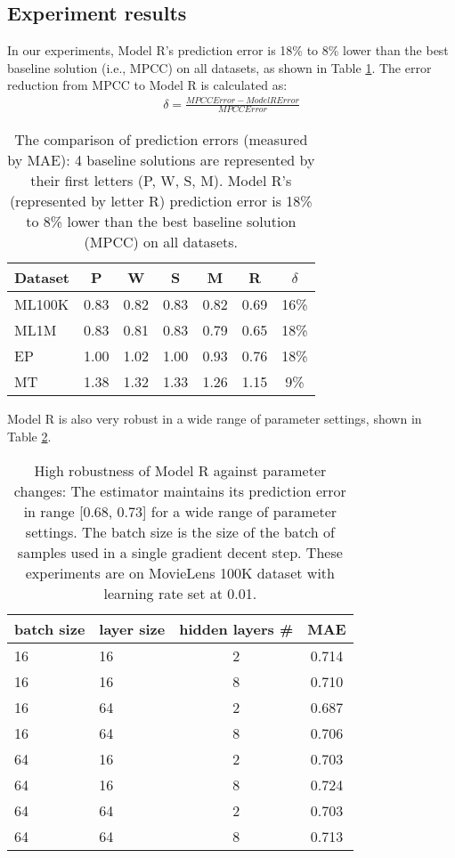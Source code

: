 \documentclass[letterpaper]{article}
\begin{document}
\subsection{Experiment results}
In our experiments, Model R's prediction error is 18\% to 8\% lower than
the best baseline solution (i.e., MPCC) on all datasets, as shown in Table 
\ref{tab:errors}.
The error reduction from MPCC to Model R is calculated as:
\begin{align*}
	\delta = \frac{MPCCError - ModelRError}{MPCCError}
\end{align*}
\begin{table}[!htb]
	\centering
	\caption{The comparison of prediction errors (measured by MAE): 4 baseline
		solutions are represented by their first letters (P, W, S, M).
		Model R's (represented by letter R) prediction error is 18\% to 8\% 
		lower than the best baseline 
		solution (MPCC) on all datasets.
		}
	\begin{tabularx}{0.47\textwidth}{|X|c|c|c|c|c|c|} \hline \rowcolor{blue!50}
		Dataset & P    & W    & S    & M    & R    & $ \delta $ \\ \hline
		ML100K  & 0.83 & 0.82 & 0.83 & 0.82 & 0.69 & 16\% \\ \hline
		ML1M    & 0.83 & 0.81 & 0.83 & 0.79 & 0.65 & 18\% \\ \hline
		EP      & 1.00 & 1.02 & 1.00 & 0.93 & 0.76 & 18\% \\ \hline
		MT      & 1.38 & 1.32 & 1.33 & 1.26 & 1.15 & 9\%  \\ \hline
	\end{tabularx}
	\label{tab:errors}
\end{table}
Model R is also very robust in a wide range of parameter settings, shown in 
Table \ref{tab:robust}.
\begin{table}[!htb]
	\centering
	\caption{High robustness of Model R against parameter changes:
		The estimator maintains its prediction error in range [0.68, 0.73] for 
		a wide range of parameter settings. The batch size is the size of the 
		batch of samples used in a single gradient decent step.
		These experiments are on MovieLens 100K dataset with learning rate set 
		at 0.01.
	}
	\begin{tabularx}{0.47\textwidth}{|X|X|c|c|}  \hline \rowcolor{blue!50}
		 batch size & layer size & hidden layers \# & MAE \\ \hline
		 16 & 16 & 2 & 0.714 \\ \hline
		 16 & 16 & 8 & 0.710 \\ \hline
		 16 & 64 & 2 & 0.687 \\ \hline
		 16 & 64 & 8 & 0.706 \\ \hline
		 64 & 16 & 2 & 0.703 \\ \hline
		 64 & 16 & 8 & 0.724 \\ \hline
		 64 & 64 & 2 & 0.703 \\ \hline
		 64 & 64 & 8 & 0.713 \\ \hline
	\end{tabularx}
	\label{tab:robust}
\end{table}
\end{document}
